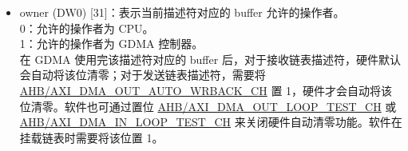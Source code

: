 \documentclass[main\_\_CN.tex]{subfiles}
\begin{document}
\begin{itemize}
    \item owner (DW0) [31]：表示当前描述符对应的 buffer 允许的操作者。\\
    0：允许的操作者为 CPU。\\
    1：允许的操作者为 GDMA 控制器。\\
    在 GDMA 使用完该描述符对应的 buffer 后，对于接收链表描述符，硬件默认会自动将该位清零；对于发送链表描述符，需要将 \hyperref[fielddesc:AHBDMAOUTAUTOWRBACKCHN]{AHB/AXI\_DMA\_OUT\_AUTO\_WRBACK\_CH} 置 1，硬件才会自动将该位清零。软件也可通过置位 \hyperref[fielddesc:AHBDMAOUTLOOPTESTCHN]{AHB/AXI\_DMA\_OUT\_LOOP\_TEST\_CH} 或 \hyperref[fielddesc:AHBDMAINLOOPTESTCHN]{AHB/AXI\_DMA\_IN\_LOOP\_TEST\_CH} 来关闭硬件自动清零功能。软件在挂载链表时需要将该位置 1。


\end{itemize}
\end{document}
